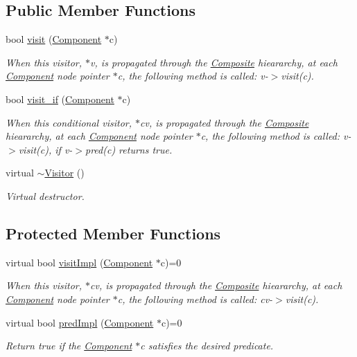 \subsection*{Public Member Functions}
\begin{DoxyCompactItemize}
\item 
bool \hyperlink{classchem_1_1Visitor_a710015ef735e109c812edbb653d6d598}{visit} (\hyperlink{classchem_1_1Component}{Component} $\ast$c)
\begin{DoxyCompactList}\small\item\em When this visitor, $\ast$v, is propagated through the \hyperlink{classchem_1_1Composite}{Composite} hieararchy, at each \hyperlink{classchem_1_1Component}{Component} node pointer $\ast$c, the following method is called\-: v-\/$>$visit(c). \end{DoxyCompactList}\item 
bool \hyperlink{classchem_1_1Visitor_ad02a683bb0cf97d9df381c3efeb90a06}{visit\-\_\-if} (\hyperlink{classchem_1_1Component}{Component} $\ast$c)
\begin{DoxyCompactList}\small\item\em When this conditional visitor, $\ast$cv, is propagated through the \hyperlink{classchem_1_1Composite}{Composite} hieararchy, at each \hyperlink{classchem_1_1Component}{Component} node pointer $\ast$c, the following method is called\-: v-\/$>$visit(c), if v-\/$>$pred(c) returns true. \end{DoxyCompactList}\item 
virtual \hyperlink{classchem_1_1Visitor_a1f8b4dc62e90ed58f0b53e906a782ee0}{$\sim$\-Visitor} ()
\begin{DoxyCompactList}\small\item\em Virtual destructor. \end{DoxyCompactList}\end{DoxyCompactItemize}
\subsection*{Protected Member Functions}
\begin{DoxyCompactItemize}
\item 
virtual bool \hyperlink{classchem_1_1Visitor_ae058e8ac35f22b03d23ae443d12c71ea}{visit\-Impl} (\hyperlink{classchem_1_1Component}{Component} $\ast$c)=0
\begin{DoxyCompactList}\small\item\em When this visitor, $\ast$cv, is propagated through the \hyperlink{classchem_1_1Composite}{Composite} hieararchy, at each \hyperlink{classchem_1_1Component}{Component} node pointer $\ast$c, the following method is called\-: cv-\/$>$visit(c). \end{DoxyCompactList}\item 
virtual bool \hyperlink{classchem_1_1Visitor_a8f11a43266d18d1396236d0c5f3a8ad6}{pred\-Impl} (\hyperlink{classchem_1_1Component}{Component} $\ast$c)=0
\begin{DoxyCompactList}\small\item\em Return true if the \hyperlink{classchem_1_1Component}{Component} $\ast$c satisfies the desired predicate. \end{DoxyCompactList}\end{DoxyCompactItemize}


